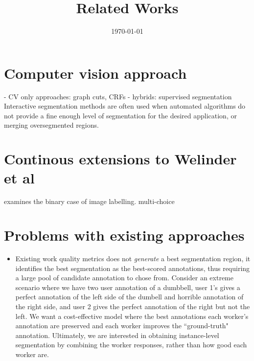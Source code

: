 \documentclass[12pt]{article}
\begin{document}
\title{Related Works}
\author{\today}
\date{}
\vspace{-50pt}
\maketitle
\vspace{-70pt}

\section{Computer vision approach}
- CV only approaches: graph cuts, CRFs
- hybrids: supervised segmentation
Interactive segmentation methods are often used when automated algorithms do not provide a fine enough level of segmentation for the desired application, or merging oversegmented regions.
\section{Continous extensions to Welinder et al}
\cite{Welinder2010} examines the binary case of image labelling. 
multi-choice 

\section{Problems with existing approaches}
\begin{itemize}
\item Existing work quality metrics does not \textit{generate} a best segmentation region, it identifies the best segmentation as the best-scored annotations, thus requiring a large pool of candidate annotation to chose from. Consider an extreme scenario where we have two user annotation of a dumbbell, user 1's gives a perfect annotation of the left side of the dumbell and horrible annotation of the right side, and user 2 gives the perfect annotation of the right but not the left. We want a cost-effective model where the best annotations each worker's annotation are preserved and each worker improves the ``ground-truth" annotation. Ultimately, we are interested in obtaining instance-level segmentation by combining the worker responses, rather than how good each worker are.	
\end{itemize}


\end{document}
